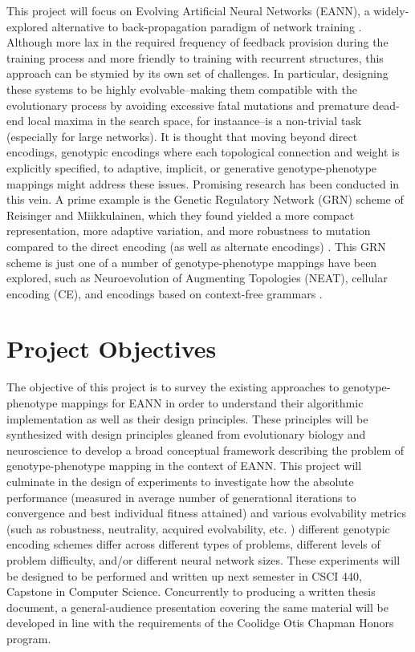 \documentclass[a4paper]{article}
\begin{document}
This project will focus on Evolving Artificial Neural Networks (EANN), a widely-explored alternative to back-propagation paradigm of network training \cite{DowningIntelligenceSystems}. Although more lax in the required frequency of feedback provision during the training process and more friendly to training with recurrent structures, this approach can be stymied by its own set of challenges. In particular, designing these systems to be highly evolvable--making them compatible with the evolutionary process by avoiding excessive fatal mutations and premature dead-end local maxima in the search space, for instaance--is a non-trivial task (especially for large networks). It is thought that moving beyond direct encodings, genotypic encodings where each topological connection and weight is explicitly specified, to adaptive, implicit, or generative genotype-phenotype mappings might address these issues. Promising research has been conducted in this vein. A prime example is the Genetic Regulatory Network (GRN) scheme of Reisinger and Miikkulainen, which they found yielded a more compact representation, more adaptive variation, and more robustness to mutation compared to the direct encoding (as well as alternate encodings) \cite{ReisingerAcquiringRepresentations}. This GRN scheme is just one of a number of genotype-phenotype mappings have been explored, such as Neuroevolution of Augmenting Topologies (NEAT), cellular encoding (CE), and encodings based on context-free grammars \cite{DowningIntelligenceSystems}.


\section{Project Objectives}
The objective of this project is to survey the existing approaches to genotype-phenotype mappings for EANN in order to understand their algorithmic implementation as well as their design principles. These principles will be synthesized with design principles gleaned from evolutionary biology and neuroscience to develop a broad conceptual framework describing the problem of genotype-phenotype mapping in the context of EANN. This project will culminate in the design of experiments to investigate how the absolute performance (measured in average number of generational iterations to convergence and best individual fitness attained) and various evolvability metrics (such as robustness, neutrality, acquired evolvability, etc. \cite{Richter2015EvolvabilitySurvey, ReisingerAcquiringRepresentations}) different genotypic encoding schemes differ across different types of problems, different levels of problem difficulty, and/or different neural network sizes. These experiments will be designed to be performed and written up next semester in CSCI 440, Capstone in Computer Science. Concurrently to producing a written thesis document, a general-audience presentation covering the same material will be developed in line with the requirements of the Coolidge Otis Chapman Honors program.

\clearpage
\printbibliography
\end{document}
